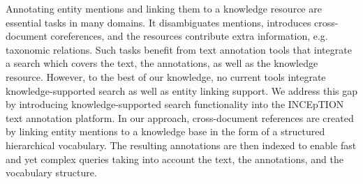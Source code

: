 Annotating entity mentions and linking them to a knowledge resource are essential tasks in many domains. It disambiguates mentions, introduces cross-document coreferences, and the resources  contribute extra information, e.g. taxonomic relations. Such tasks benefit from text annotation tools that integrate a search which covers the text, the annotations, as well as the knowledge resource. However, to the best of our knowledge, no current  tools integrate knowledge-supported search as well as entity linking support. We address this gap by introducing knowledge-supported search functionality into the INCEpTION text annotation platform. In our approach, cross-document references are created by linking entity mentions to a knowledge base in the form of a structured hierarchical vocabulary. The resulting annotations are then indexed to enable fast and yet complex queries taking into account the text, the annotations, and the vocabulary structure.
